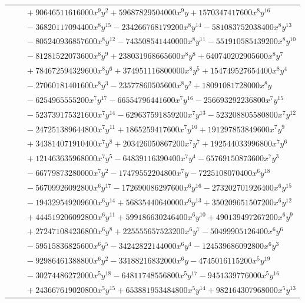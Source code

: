 \documentclass[11pt]{article}
\begin{document}
\begin{longtable}{@{}ll@{}}
 & $\quad +90646511616000x^{9}y^{2}+59687829504000x^{9}y+1570347417600x^{8}y^{16}$\\
 & $\quad -36820117094400x^{8}y^{15}-234266768179200x^{8}y^{14}-581083752038400x^{8}y^{13}$\\
 & $\quad -805240936857600x^{8}y^{12}-743508541440000x^{8}y^{11}-551910585139200x^{8}y^{10}$\\
 & $\quad -81281522073600x^{8}y^{9}+238031968665600x^{8}y^{8}+640740202905600x^{8}y^{7}$\\
 & $\quad +784672594329600x^{8}y^{6}+374951116800000x^{8}y^{5}+154749527654400x^{8}y^{4}$\\
 & $\quad -27060181401600x^{8}y^{3}-23577860505600x^{8}y^{2}+18091081728000x^{8}y$\\
 & $\quad -6254965555200x^{7}y^{17}-66554796441600x^{7}y^{16}-256693292236800x^{7}y^{15}$\\
 & $\quad -523739175321600x^{7}y^{14}-629637591859200x^{7}y^{13}-523208805580800x^{7}y^{12}$\\
 & $\quad -247251389644800x^{7}y^{11}+1865259417600x^{7}y^{10}+191297853849600x^{7}y^{9}$\\
 & $\quad +343814071910400x^{7}y^{8}+203426050867200x^{7}y^{7}+192544033996800x^{7}y^{6}$\\
 & $\quad +121463635968000x^{7}y^{5}-64839116390400x^{7}y^{4}-65769150873600x^{7}y^{3}$\\
 & $\quad -66779873280000x^{7}y^{2}-17479552204800x^{7}y-7225108070400x^{6}y^{18}$\\
 & $\quad -56709926092800x^{6}y^{17}-172690086297600x^{6}y^{16}-273202701926400x^{6}y^{15}$\\
 & $\quad -194329549209600x^{6}y^{14}+56835440640000x^{6}y^{13}+350209651507200x^{6}y^{12}$\\
 & $\quad +444519206092800x^{6}y^{11}+599186630246400x^{6}y^{10}+490139497267200x^{6}y^{9}$\\
 & $\quad +272471084236800x^{6}y^{8}+225555657523200x^{6}y^{7}-50499905126400x^{6}y^{6}$\\
 & $\quad -59515836825600x^{6}y^{5}-34242822144000x^{6}y^{4}-124539686092800x^{6}y^{3}$\\
 & $\quad -92986461388800x^{6}y^{2}-33188216832000x^{6}y-4745016115200x^{5}y^{19}$\\
 & $\quad -30274486272000x^{5}y^{18}-64811748556800x^{5}y^{17}-9451339776000x^{5}y^{16}$\\
 & $\quad +243667619020800x^{5}y^{15}+653881953484800x^{5}y^{14}+982164307968000x^{5}y^{13}$\\

\end{longtable}
\end{document}
